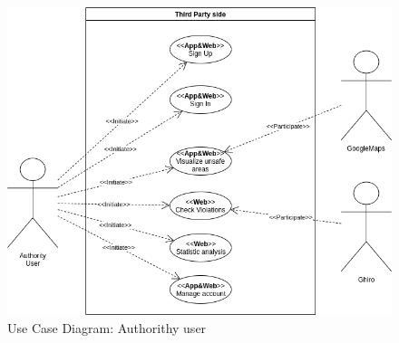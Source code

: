 \documentclass{article}
\begin{document}
\begin{figure}[H]
    \centering
    \includegraphics[scale=0.5]{Images/UseCaseThirdPartyView}
    \caption{Use Case Diagram: Authorithy user}
\end{figure}
\end{document}
